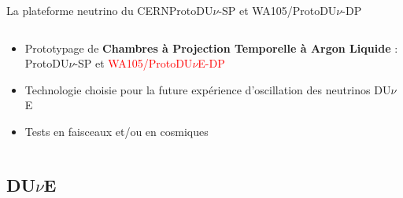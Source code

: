 \begin{frame}{La plateforme neutrino du CERN}{ProtoDU$\nu$-SP et WA105/ProtoDU$\nu$-DP}
\begin{columns}
\begin{column}{0.5\textwidth}
\begin{scriptsize}
                    \begin{itemize}
                        \item Prototypage de \textbf{Chambres à Projection Temporelle à Argon Liquide} : ProtoDU$\nu$-SP et \textcolor{red}{WA105/ProtoDU$\nu$E-DP}
                        \item Technologie choisie pour la future expérience d'oscillation des neutrinos DU$\nu$E
                        \item Tests en faisceaux et/ou en cosmiques
                    \end{itemize}
                \end{scriptsize}
            \end{column}
        \end{columns}
    \end{frame}
        
    \subsection{DU$\nu$E}
        
